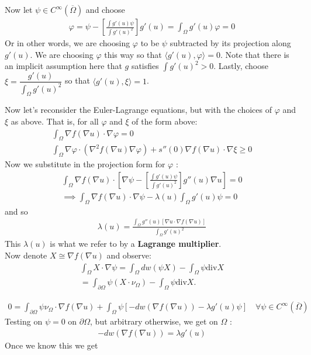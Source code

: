\documentclass{memoir}
\begin{document}
\hline

Now let \(\psi \in C^{\infty}(\overline{\Omega })\) and choose
\begin{align*}
	\varphi = \psi - \left[ \frac{\int g '(u) \psi }{\int  g '(u)^2} \right] g'(u) = \int_\Omega g'(u)\varphi =0
\end{align*}
Or in other words, we are choosing \(\varphi \) to be \(\psi \) subtracted by its projection along \(g'(u)\). We are choosing \(\varphi \) this way so that \(\langle g'(u), \varphi  \rangle = 0\). Note that there is an implicit assumption here that \(g\) satisfies \(\int g '(u)^2 > 0\). Lastly, choose \(\xi = \dfrac{g'(u)}{\int_\Omega g'(u)^2}\) so that \(\langle g'(u),\xi  \rangle= 1\).

Now let's reconsider the Euler-Lagrange equations, but with the choices of \(\varphi \) and \(\xi \) as above. That is, for all \(\varphi \) and \(\xi \) of the form above:
\begin{align*}
	\int_\Omega \nabla f(\nabla u)\cdot \nabla \varphi = 0\\
	\int_\Omega \nabla \varphi \cdot (\nabla^2f(\nabla u)\nabla \varphi ) + s''(0) \nabla f(\nabla u)\cdot \nabla \xi \geq 0
\end{align*}
Now we substitute in the projection form for \(\varphi \) :
\begin{align*}
	\int_\Omega \nabla f ( \nabla u) \cdot \left[ \nabla \psi - \left[ \frac{\int g'(u) \psi }{\int g'(u)^2} \right] g''(u) \nabla u \right]= 0 \\
\implies \int_\Omega \nabla f(\nabla u)\cdot \nabla \psi - \lambda (u) \int_\Omega g'(u) \psi = 0
\end{align*}
and so
\begin{align*}
	\lambda (u) = \frac{\int_\Omega g''(u) \left[ \nabla u \cdot \nabla f(\nabla u) \right] }{\int_\Omega g'(u)^2}
\end{align*}
This \(\lambda(u)\) is what we refer to by a \textbf{Lagrange multiplier}.\\

Now denote \(X \cong \nabla f(\nabla u)\) and observe:
\begin{align*}
	\int_\Omega X \cdot \nabla \psi = \int_\Omega dw(\psi X) - \int_\Omega \psi \textrm{div}X\\
	= \int_{\partial\Omega }\psi (X\cdot \nu_\Omega ) - \int_\Omega \psi \textrm{div}X.
\end{align*}

\begin{align*}
	0 = \int_{\partial\Omega }\psi \nu_\Omega \cdot \nabla f(\nabla u) + \int_\Omega \psi \left[ -dw(\nabla f(\nabla u)) - \lambda g'(u) \psi  \right] \quad \forall \psi \in C^{\infty}(\overline{\Omega })
\end{align*}
Testing on \(\psi =0\) on \(\partial\Omega \), but arbitrary otherwise, we get on \(\Omega \) :
\begin{align*}
	-dw(\nabla f(\nabla u)) = \lambda g'(u)
\end{align*}
Once we know this we get
\end{document}
